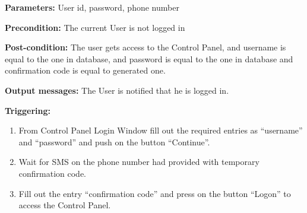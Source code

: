 \begin{description}

\item \textbf{Parameters:} User id, password, phone number
\item \textbf{Precondition:} The current User is not logged in
\item \textbf{Post-condition:} The user gets access to the Control Panel, and
username is equal to the one in database, and password is equal to the one in
database and confirmation code is equal to generated one.
\item \textbf{Output messages:} The User is notified that he is logged in.

\item \textbf{Triggering:}
\begin{enumerate}
\item From Control Panel Login Window fill out the required entries as
``username'' and ``password'' and push on the button ``Continue''.
\item Wait for SMS on the phone number had provided with temporary confirmation
code.
\item Fill out the entry ``confirmation code'' and press on the button ``Logon''
to access the Control Panel.
\end{enumerate}
 
\end{description}


